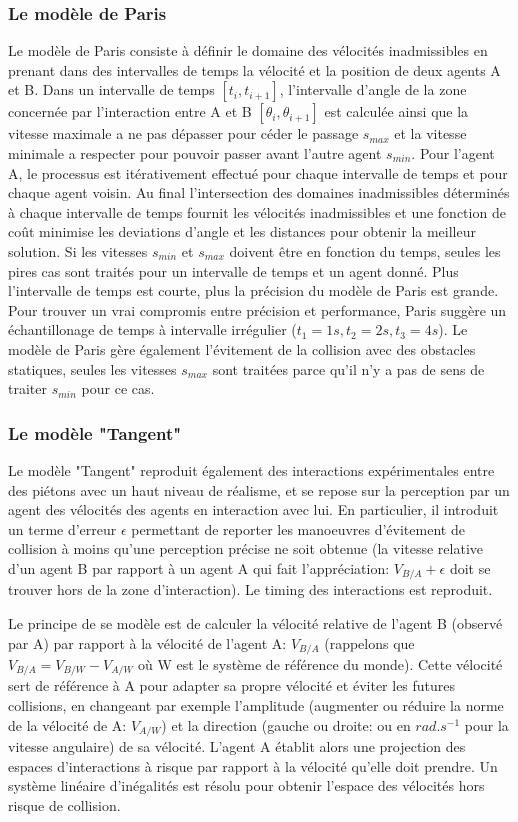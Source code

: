 \documentclass[11pt]{article}
\begin{document}
\subsubsection*{Le modèle de Paris}

Le modèle de Paris consiste à définir le domaine des vélocités inadmissibles en prenant dans des intervalles de temps la vélocité et la position de deux agents A et B. Dans un intervalle de temps $[t_i, t_{i+1}]$, l'intervalle d'angle de la zone concernée par l'interaction entre A et B $[\theta_i, \theta_{i+1}]$ est calculée ainsi que la vitesse maximale a ne pas dépasser pour céder le passage $s_{max}$ et la vitesse minimale a respecter pour pouvoir passer avant l'autre agent $s_{min}$. Pour l'agent A, le processus est itérativement effectué pour chaque intervalle de temps et pour chaque agent voisin. Au final l'intersection des domaines inadmissibles déterminés à chaque intervalle de temps fournit les vélocités inadmissibles et une fonction de coût minimise les deviations d'angle et les distances pour obtenir la meilleur solution.
Si les vitesses $s_{min}$ et $s_{max}$ doivent être en fonction du temps, seules les pires cas sont traités pour un intervalle de temps et un agent donné. Plus l'intervalle de temps est courte, plus la précision du modèle de Paris est grande. Pour trouver un vrai compromis entre précision et performance, Paris suggère un échantillonage de temps à intervalle irrégulier ($t_1 = 1s, t_2 = 2s, t_3 = 4s$).
Le modèle de Paris gère également l'évitement de la collision avec des obstacles statiques, seules les vitesses $s_{max}$ sont traitées parce qu'il n'y a pas de sens de traiter $s_{min}$ pour ce cas.

\subsubsection*{Le modèle "Tangent"}

Le modèle "Tangent" reproduit également des interactions expérimentales entre des piétons avec un haut niveau de réalisme, et se repose sur la perception par un agent des vélocités des agents en interaction avec lui. En particulier, il introduit un terme d'erreur $\epsilon$ permettant de reporter les manoeuvres d'évitement de collision à moins qu'une perception précise ne soit obtenue (la vitesse relative d'un agent B par rapport à un agent A qui fait l'appréciation: $V_{B/A} + \epsilon$ doit se trouver hors de la zone d'interaction). Le timing des interactions est reproduit. 

Le principe de se modèle est de calculer la vélocité relative de l'agent B (observé par A)  par rapport à la vélocité de l'agent A: $V_{B/A}$ (rappelons que $V_{B/A} = V_{B/W} - V_{A/W} $ où W est le système de référence du monde). Cette vélocité sert de référence à A pour adapter sa propre vélocité et éviter les futures collisions, en changeant par exemple l'amplitude (augmenter ou réduire la norme de la vélocité de A: $V_{A/W}$) et la direction (gauche ou droite: ou en $rad.s^{-1}$ pour la vitesse angulaire) de sa vélocité. L'agent A établit alors une projection des espaces d'interactions à risque par rapport à la vélocité qu'elle doit prendre. Un système linéaire d'inégalités est résolu pour obtenir l'espace des vélocités hors risque de collision.
\end{document}
